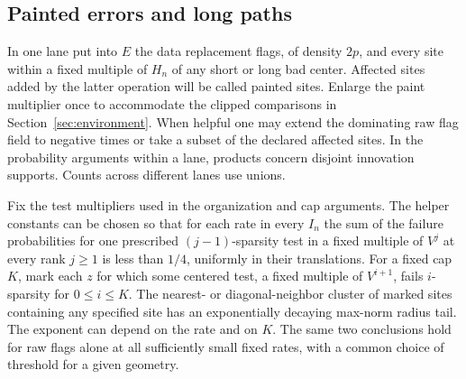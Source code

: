 \subsection{Painted errors and long paths}\label{sec:joint}

In one lane put into \(E\) the data replacement flags, of density \(2p\), and every site within a fixed multiple of \(H_n\) of any short or long bad center. Affected sites added by the latter operation will be called painted sites. Enlarge the paint multiplier once to accommodate the clipped comparisons in Section~\ref{sec:environment}. When helpful one may extend the dominating raw flag field to negative times or take a subset of the declared affected sites. In the probability arguments within a lane, products concern disjoint innovation supports. Counts across different lanes use unions.

\begin{lemma}\label{lem:joint}
Fix the test multipliers used in the organization and cap arguments. The helper constants can be chosen so that for each rate in every \(I_n\) the sum of the failure probabilities for one prescribed \((j-1)\)-sparsity test in a fixed multiple of \(V^j\) at every rank \(j\ge1\) is less than \(1/4\), uniformly in their translations. For a fixed cap \(K\), mark each \(z\) for which some centered test, a fixed multiple of \(V^{i+1}\), fails \(i\)-sparsity for \(0\le i\le K\). The nearest- or diagonal-neighbor cluster of marked sites containing any specified site has an exponentially decaying max-norm radius tail. The exponent can depend on the rate and on \(K\). The same two conclusions hold for raw flags alone at all sufficiently small fixed rates, with a common choice of threshold for a given geometry.
\end{lemma}

